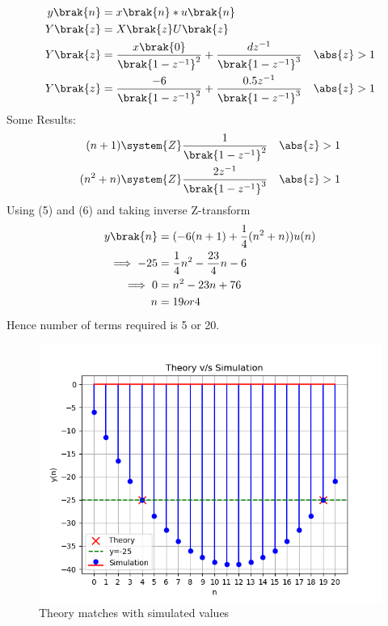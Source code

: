 \documentclass[journal,12pt,twocolumn]{IEEEtran}
\theoremstyle{remark}
\begin{document}
\begin{align} 
    y\brak{n} &= x\brak{n} * u\brak{n}\\
    Y\brak{z} &= X\brak{z} U \brak{z}\\
    Y\brak{z} &= \frac{x\brak{0}}{\brak{1-z^{-1}}^2} + \frac{dz^{-1}}{\brak{1-z^{-1}}^3}\quad\abs{z}>{1}\\
    Y\brak{z} &= \frac{-6}{\brak{1-z^{-1}}^2} + \frac{0.5z^{-1}}{\brak{1-z^{-1}}^3}\quad\abs{z}>{1}
\end{align}
 Some Results:
\begin{align}
  (n+1)\system{Z} \frac{1}{\brak{1-z^{-1}}^2}\quad\abs{z}>{1}\\ 
  (n^2+n)\system{Z}\frac{2z^{-1}}{\brak{1-z^{-1}}^3}\quad\abs{z}>{1}
\end{align}
Using (5) and (6) and taking inverse Z-transform
\begin{align}
  y\brak{n} &= (-6(n+1)+\frac{1}{4}(n^2+n))u(n)\\
  \implies -25 &= \frac{1}{4}n^2-\frac{23}{4}n-6\\
 \implies 0 &=n^{2}-23n+76\\
    n &= 19 or 4
\end{align}
Hence number of terms required is 5 or 20.
\begin{figure}[!ht]
    \centering
    \includegraphics[width=1\linewidth]{ncert-maths/11/9/2/4/figs/plot.png}
    \caption{Theory matches with simulated values}
\end{figure}
\end{document}
